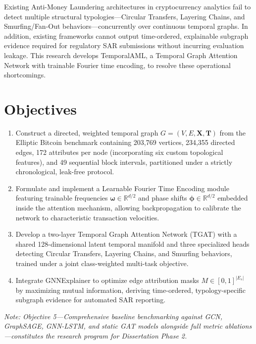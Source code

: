 Existing Anti-Money Laundering architectures in cryptocurrency analytics fail to detect multiple structural typologies—Circular Transfers, Layering Chains, and Smurfing/Fan-Out behaviors—concurrently over continuous temporal graphs. In addition, existing frameworks cannot output time-ordered, explainable subgraph evidence required for regulatory SAR submissions without incurring evaluation leakage. This research develops TemporalAML, a Temporal Graph Attention Network with trainable Fourier time encoding, to resolve these operational shortcomings.


\section{Objectives}
\label{sec:lit_objectives}

\begin{enumerate}
	\item[\textbf{O1}] Construct a directed, weighted temporal graph $G = (V, E, \mathbf{X}, \mathbf{T})$ from the Elliptic Bitcoin benchmark containing 203,769 vertices, 234,355 directed edges, 172 attributes per node (incorporating six custom topological features), and 49 sequential block intervals, partitioned under a strictly chronological, leak-free protocol.
	
	\item[\textbf{O2}] Formulate and implement a Learnable Fourier Time Encoding module featuring trainable frequencies $\boldsymbol{\omega} \in \mathbb{R}^{d/2}$ and phase shifts $\boldsymbol{\phi} \in \mathbb{R}^{d/2}$ embedded inside the attention mechanism, allowing backpropagation to calibrate the network to characteristic transaction velocities.
	
	\item[\textbf{O3}] Develop a two-layer Temporal Graph Attention Network (TGAT) with a shared 128-dimensional latent temporal manifold and three specialized heads detecting Circular Transfers, Layering Chains, and Smurfing behaviors, trained under a joint class-weighted multi-task objective.
	
	\item[\textbf{O4}] Integrate GNNExplainer to optimize edge attribution masks $M \in [0,1]^{|E_s|}$ by maximizing mutual information, deriving time-ordered, typology-specific subgraph evidence for automated SAR reporting.
\end{enumerate}

\noindent \textit{Note: Objective 5—Comprehensive baseline benchmarking against GCN, GraphSAGE, GNN-LSTM, and static GAT models alongside full metric ablations—constitutes the research program for Dissertation Phase 2.}


